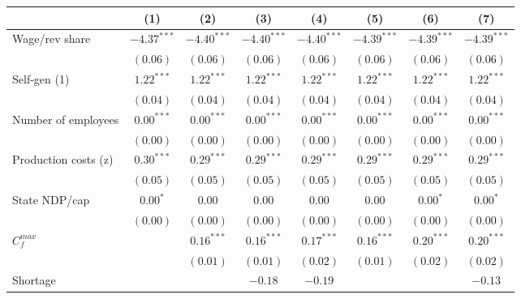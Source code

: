 
\begin{tabular}{l c c c c c c c }
\toprule
 & (1) & (2) & (3) & (4) & (5) & (6) & (7) \\
\midrule
Wage/rev share                         & $-4.37^{***}$ & $-4.40^{***}$ & $-4.40^{***}$ & $-4.40^{***}$ & $-4.39^{***}$ & $-4.39^{***}$ & $-4.39^{***}$ \\
                                       & $(0.06)$      & $(0.06)$      & $(0.06)$      & $(0.06)$      & $(0.06)$      & $(0.06)$      & $(0.06)$      \\
Self-gen (1)                           & $1.22^{***}$  & $1.22^{***}$  & $1.22^{***}$  & $1.22^{***}$  & $1.22^{***}$  & $1.22^{***}$  & $1.22^{***}$  \\
                                       & $(0.04)$      & $(0.04)$      & $(0.04)$      & $(0.04)$      & $(0.04)$      & $(0.04)$      & $(0.04)$      \\
Number of employees                    & $0.00^{***}$  & $0.00^{***}$  & $0.00^{***}$  & $0.00^{***}$  & $0.00^{***}$  & $0.00^{***}$  & $0.00^{***}$  \\
                                       & $(0.00)$      & $(0.00)$      & $(0.00)$      & $(0.00)$      & $(0.00)$      & $(0.00)$      & $(0.00)$      \\
Production costs (z)                   & $0.30^{***}$  & $0.29^{***}$  & $0.29^{***}$  & $0.29^{***}$  & $0.29^{***}$  & $0.29^{***}$  & $0.29^{***}$  \\
                                       & $(0.05)$      & $(0.05)$      & $(0.05)$      & $(0.05)$      & $(0.05)$      & $(0.05)$      & $(0.05)$      \\
State NDP/cap                          & $0.00^{*}$    & $0.00$        & $0.00$        & $0.00$        & $0.00$        & $0.00^{*}$    & $0.00^{*}$    \\
                                       & $(0.00)$      & $(0.00)$      & $(0.00)$      & $(0.00)$      & $(0.00)$      & $(0.00)$      & $(0.00)$      \\
$C^{max}_{f}$                          &               & $0.16^{***}$  & $0.16^{***}$  & $0.17^{***}$  & $0.16^{***}$  & $0.20^{***}$  & $0.20^{***}$  \\
                                       &               & $(0.01)$      & $(0.01)$      & $(0.02)$      & $(0.01)$      & $(0.02)$      & $(0.02)$      \\
Shortage                               &               &               & $-0.18$       & $-0.19$       &               &               & $-0.13$       \\

\end{tabular}
